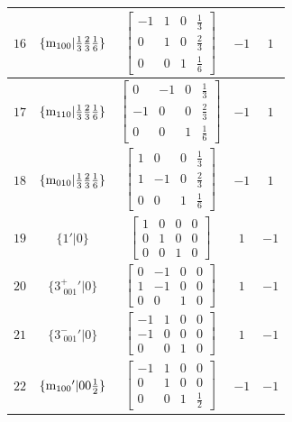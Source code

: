 \documentclass[fleqn,8pt]{jsarticle}
\begin{document}
\begin{longtable}{ccccc}
$ 16 $ & $ \{{\rm m}_{100}|\frac{1}{3} \frac{2}{3} \frac{1}{6}\} $ & $ \begin{bmatrix} -1 & 1 & 0 & \frac{1}{3} \\ 0 & 1 & 0 & \frac{2}{3} \\ 0 & 0 & 1 & \frac{1}{6} \end{bmatrix} $ & $ -1 $ & $ 1 $ \\ \hline
$ 17 $ & $ \{{\rm m}_{110}|\frac{1}{3} \frac{2}{3} \frac{1}{6}\} $ & $ \begin{bmatrix} 0 & -1 & 0 & \frac{1}{3} \\ -1 & 0 & 0 & \frac{2}{3} \\ 0 & 0 & 1 & \frac{1}{6} \end{bmatrix} $ & $ -1 $ & $ 1 $ \\ \hline
$ 18 $ & $ \{{\rm m}_{010}|\frac{1}{3} \frac{2}{3} \frac{1}{6}\} $ & $ \begin{bmatrix} 1 & 0 & 0 & \frac{1}{3} \\ 1 & -1 & 0 & \frac{2}{3} \\ 0 & 0 & 1 & \frac{1}{6} \end{bmatrix} $ & $ -1 $ & $ 1 $ \\ \hline
$ 19 $ & $ \{1{}'|0\} $ & $ \begin{bmatrix} 1 & 0 & 0 & 0 \\ 0 & 1 & 0 & 0 \\ 0 & 0 & 1 & 0 \end{bmatrix} $ & $ 1 $ & $ -1 $ \\ \hline
$ 20 $ & $ \{3^{+}_{\,\,001}{}'|0\} $ & $ \begin{bmatrix} 0 & -1 & 0 & 0 \\ 1 & -1 & 0 & 0 \\ 0 & 0 & 1 & 0 \end{bmatrix} $ & $ 1 $ & $ -1 $ \\ \hline
$ 21 $ & $ \{3^{-}_{\,\,001}{}'|0\} $ & $ \begin{bmatrix} -1 & 1 & 0 & 0 \\ -1 & 0 & 0 & 0 \\ 0 & 0 & 1 & 0 \end{bmatrix} $ & $ 1 $ & $ -1 $ \\ \hline
$ 22 $ & $ \{{\rm m}_{100}{}'|0 0 \frac{1}{2}\} $ & $ \begin{bmatrix} -1 & 1 & 0 & 0 \\ 0 & 1 & 0 & 0 \\ 0 & 0 & 1 & \frac{1}{2} \end{bmatrix} $ & $ -1 $ & $ -1 $ \\ \hline

\end{longtable}
\end{document}
